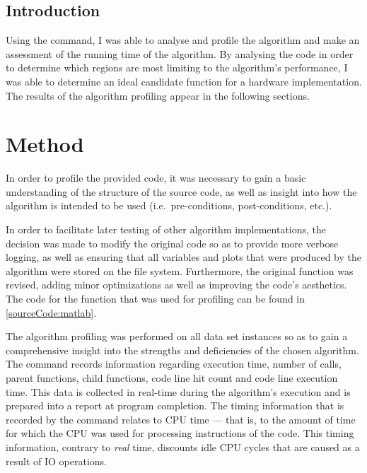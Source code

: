 \subsection{Introduction}
\label{profiling:matlab:introduction}
Using the   command, I was able to analyse and
profile the  algorithm and make
an assessment of the running time of the algorithm. By analysing the code in
order to determine which regions are most limiting to the algorithm's
performance, I was able to determine an ideal candidate function for a hardware
implementation. The results of the algorithm profiling appear in the following
sections.

\section{Method}
\label{profiling:matlab:method}
In order to profile the provided  code, it was necessary to
gain a basic understanding of the structure of the source code, as well as
insight into how the algorithm is intended to be used (i.e.\ pre-conditions,
post-conditions, etc.).

In order to facilitate later testing of other algorithm implementations, the
decision was made to modify the original code so as to provide more verbose
logging, as well as ensuring that all variables and plots that were produced by
the algorithm were stored on the file system. Furthermore, the original
 function was revised, adding minor
optimizations as well as improving the code's aesthetics. The 
code for the  function that was used for
profiling can be found in \autoref{sourceCode:matlab}.

The algorithm profiling was performed on all data set instances so as to gain a
comprehensive insight into the strengths and deficiencies of the chosen
algorithm. The   command records information
regarding execution time, number of calls, parent functions, child functions,
code line hit count and code line execution time. This data is collected in
real-time during the algorithm's execution and is prepared into a report at
program completion. The timing information that is recorded by the
 command relates to \gls{CPU} time --- that is, to the amount
of time for which the \gls{CPU} was used for processing instructions of the
code. This timing information, contrary to \emph{real} time, discounts idle
\gls{CPU} cycles that are caused as a result of \gls{IO} operations.

